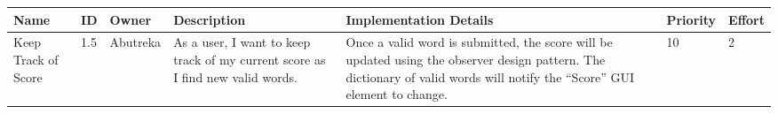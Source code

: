 \documentclass[12pt]{article}
\begin{document}
    \begin{center}
      \begin{tabular}{|p{2cm}|p{0.5cm}|p{1.5cm}|p{3cm}|p{3.5cm}|p{1.75cm}|p{1.25cm}|}
        \hline
        \textbf{Name}&\textbf{ID} &\textbf{Owner}&\textbf{Description}&\textbf{Implementation Details}&\textbf{Priority}&\textbf{Effort}
        \\\hline
        Keep Track of Score
        &1.5
        &Abutreka
        &As a user, I want to keep track of my current score as I find new valid words. 
        &Once a valid word is submitted, the score will be updated using the observer design pattern. The dictionary of valid words will notify the “Score” GUI element to change.
        &10
        &2   
        \\\hline
        \end{tabular}
    \end{center}
\end{document}
